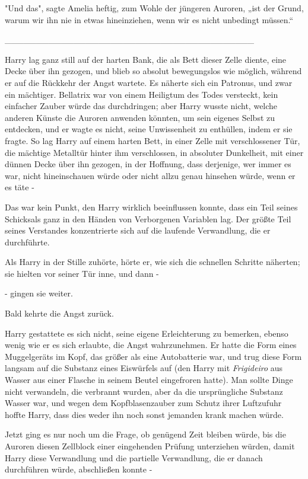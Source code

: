 {"Und das", sagte Amelia heftig, zum Wohle der jüngeren Auroren, „ist der Grund, warum wir ihn nie in etwas hineinziehen, wenn wir es nicht unbedingt müssen.“

\_\_\_\_\_\_\_\_\_\_\_\_\_\_\_\_\_\_\_\_\_\_\_\_\_\_\_\_\_\_\_\_\_\_\_\_\_\_\_\_

Harry lag ganz still auf der harten Bank, die als Bett dieser Zelle diente, eine Decke über ihn gezogen, und blieb so absolut bewegungslos wie möglich, während er auf die Rückkehr der Angst wartete. Es näherte sich ein Patronus, und zwar ein mächtiger. Bellatrix war von einem Heiligtum des Todes versteckt, kein einfacher Zauber würde das durchdringen; aber Harry wusste nicht, welche anderen Künste die Auroren anwenden könnten, um sein eigenes Selbst zu entdecken, und er wagte es nicht, seine Unwissenheit zu enthüllen, indem er sie fragte. So lag Harry auf einem harten Bett, in einer Zelle mit verschlossener Tür, die mächtige Metalltür hinter ihm verschlossen, in absoluter Dunkelheit, mit einer dünnen Decke über ihn gezogen, in der Hoffnung, dass derjenige, wer immer es war, nicht hineinschauen würde oder nicht allzu genau hinsehen würde, wenn er es täte -

Das war kein Punkt, den Harry wirklich beeinflussen konnte, dass ein Teil seines Schicksals ganz in den Händen von Verborgenen Variablen lag. Der größte Teil seines Verstandes konzentrierte sich auf die laufende Verwandlung, die er durchführte.

Als Harry in der Stille zuhörte, hörte er, wie sich die schnellen Schritte näherten; sie hielten vor seiner Tür inne, und dann -

- gingen sie weiter.

Bald kehrte die Angst zurück.

Harry gestattete es sich nicht, seine eigene Erleichterung zu bemerken, ebenso wenig wie er es sich erlaubte, die Angst wahrzunehmen. Er hatte die Form eines Muggelgeräts im Kopf, das größer als eine Autobatterie war, und trug diese Form langsam auf die Substanz eines Eiswürfels auf (den Harry mit \emph{Frigideiro} aus Wasser aus einer Flasche in seinem Beutel eingefroren hatte). Man sollte Dinge nicht verwandeln, die verbrannt wurden, aber da die ursprüngliche Substanz Wasser war, und wegen dem Kopfblasenzauber zum Schutz ihrer Luftzufuhr hoffte Harry, dass dies weder ihn noch sonst jemanden krank machen würde.

Jetzt ging es nur noch um die Frage, ob genügend Zeit bleiben würde, bis die Auroren diesen Zellblock einer eingehenden Prüfung unterziehen würden, damit Harry diese Verwandlung und die partielle Verwandlung, die er danach durchführen würde, abschließen konnte -

}

